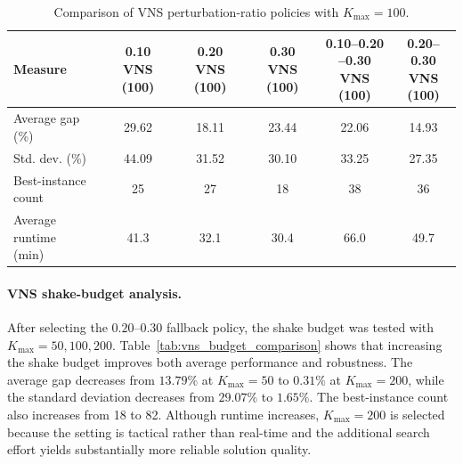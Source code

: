 \documentclass[11pt]{article}
\begin{document}
\begin{table}[H]
\centering
\caption{Comparison of VNS perturbation-ratio policies with \(K_{\max}=100\).}
\label{tab:vns_ratio_comparison}
\small
\begin{tabular}{lccccc}
\hline
\textbf{Measure}
&
\shortstack{\textbf{0.10}\\\textbf{VNS (100)}}
&
\shortstack{\textbf{0.20}\\\textbf{VNS (100)}}
&
\shortstack{\textbf{0.30}\\\textbf{VNS (100)}}
&
\shortstack{\textbf{0.10--0.20}\\\textbf{--0.30}\\\textbf{VNS (100)}}
&
\shortstack{\textbf{0.20--0.30}\\\textbf{VNS}\\\textbf{(100)}} \\
\hline
Average gap (\%) & 29.62 & 18.11 & 23.44 & 22.06 & 14.93 \\
Std. dev. (\%) & 44.09 & 31.52 & 30.10 & 33.25 & 27.35 \\
\shortstack[l]{Best-instance\\count} & 25 & 27 & 18 & 38 & 36 \\
\shortstack[l]{Average runtime\\(min)} & 41.3 & 32.1 & 30.4 & 66.0 & 49.7 \\
\hline
\end{tabular}
\end{table}

\paragraph{VNS shake-budget analysis.}
After selecting the \(0.20\)--\(0.30\) fallback policy, the shake budget was tested with \(K_{\max}=50,100,200\). Table~\ref{tab:vns_budget_comparison} shows that increasing the shake budget improves both average performance and robustness. The average gap decreases from \(13.79\%\) at \(K_{\max}=50\) to \(0.31\%\) at \(K_{\max}=200\), while the standard deviation decreases from \(29.07\%\) to \(1.65\%\). The best-instance count also increases from 18 to 82. Although runtime increases, \(K_{\max}=200\) is selected because the setting is tactical rather than real-time and the additional search effort yields substantially more reliable solution quality.
\end{document}
